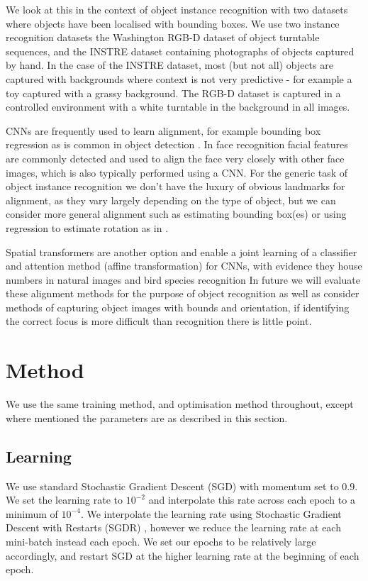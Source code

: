 \documentclass[conference]{IEEEtran}
\begin{document}
We look at this in the context of object instance recognition with two datasets where objects have been localised with bounding boxes. We use two instance recognition datasets the Washington RGB-D dataset \cite{Lai2011} of object turntable sequences, and the INSTRE dataset \cite{Wang2015} containing photographs of objects captured by hand. In the case of the INSTRE dataset, most (but not all) objects are captured with backgrounds where context is not very predictive - for example a toy captured with a grassy background. The RGB-D dataset is captured in a controlled environment with a white turntable in the background in all images.

CNNs are frequently used to learn alignment, for example bounding box regression as is common in object detection \cite{Sermanet2013}. In face recognition facial features are commonly detected and used to align the face very closely with other face images, which is also typically performed using a CNN. For the generic task of object instance recognition we don't have the luxury of obvious landmarks for alignment, as they vary largely depending on the type of object, but we can consider more general alignment such as estimating bounding box(es) or using regression to estimate rotation as in \cite {Fischer2015}. 

Spatial transformers \cite{Jaderberg2015a} are another option and enable a joint learning of a classifier and attention method (affine transformation) for CNNs, with evidence they  house numbers in natural images \cite{Netzer2011} and bird species recognition \cite{Wah2011} In future we will evaluate these alignment methods for the purpose of object recognition as well as consider methods of capturing object images with bounds and orientation, if identifying the correct focus is more difficult than recognition there is little point.


\section{Method}

We use the same training method, and optimisation method throughout, except where mentioned the parameters are as described in this section. 

\subsection {Learning}

We use standard Stochastic Gradient Descent (SGD) with momentum set to $ 0.9 $. We set the learning rate to $ 10^{-2} $ and interpolate this rate across each epoch to a minimum of $ 10^{-4} $. We interpolate the learning rate using Stochastic Gradient Descent with Restarts (SGDR) \cite{Loshchilov2016}, however we reduce the learning rate at each mini-batch instead each epoch. We set our epochs to be relatively large accordingly, and restart SGD at the higher learning rate at the beginning of each epoch. 
\end{document}

